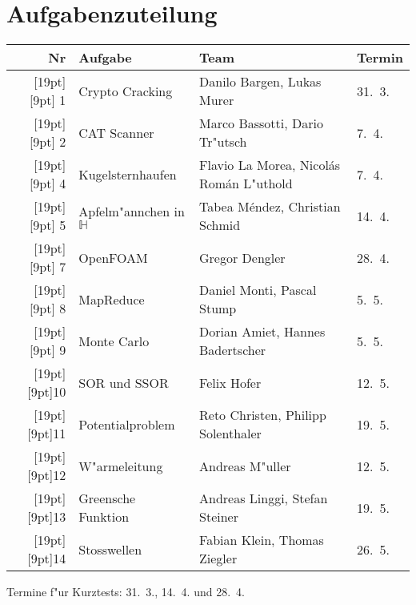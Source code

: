 \documentclass[a4paper,12pt]{article}
\begin{document}
\section{Aufgabenzuteilung}
\def\aufnr#1{\raisebox{0pt}[19pt][9pt]{#1}}
\begin{center}
\begin{tabular}{|r|l|l|l|}
\hline
Nr&Aufgabe&Team&Termin\\
\hline
\aufnr{ 1}&Crypto Cracking                &Danilo Bargen, Lukas Murer&31.~3.\\
\hline
\aufnr{ 2}&CAT Scanner                    &Marco Bassotti, Dario Tr"utsch&7.~4.\\
\hline
\aufnr{ 4}&Kugelsternhaufen               &Flavio La Morea, Nicol\'as Rom\'an L"uthold&7.~4.\\
\hline
\aufnr{ 5}&Apfelm"annchen in $\mathbb H$  &Tabea M\'endez, Christian Schmid&14.~4.\\
\hline
\aufnr{ 7}&OpenFOAM                       &Gregor Dengler&28.~4.\\
\hline
\aufnr{ 8}&MapReduce                      &Daniel Monti, Pascal Stump&5.~5.\\
\hline
\aufnr{ 9}&Monte Carlo                    &Dorian Amiet, Hannes Badertscher&5.~5.\\
\hline
\aufnr{10}&SOR und SSOR                   &Felix Hofer&12.~5.\\
\hline
\aufnr{11}&Potentialproblem               &Reto Christen, Philipp Solenthaler&19.~5.\\
\hline
\aufnr{12}&W"armeleitung                  &Andreas M"uller&12.~5.\\
\hline
\aufnr{13}&Greensche Funktion             &Andreas Linggi, Stefan Steiner&19.~5.\\
\hline
\aufnr{14}&Stosswellen                    &Fabian Klein, Thomas Ziegler&26.~5.\\
\hline
\end{tabular}
\end{center}
Termine f"ur Kurztests: 31.~3., 14.~4. und 28.~4.
\end{document}
